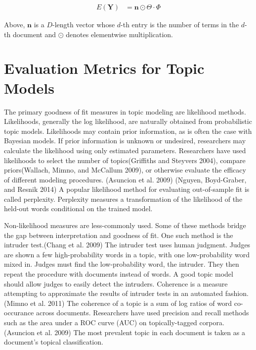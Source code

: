 \documentclass[conference,final,]{IEEEtran}
\begin{document}
\begin{align}
  E(\mathbf{Y}) &= \mathbf{n} \odot \Theta \cdot \Phi
\end{align}

Above, \(\mathbf{n}\) is a \(D\)-length vector whose \(d\)-th entry is
the number of terms in the \(d\)-th document and \(\odot\) denotes
elementwise multiplication.

\hypertarget{evaluation-metrics-for-topic-models}{%
\section{Evaluation Metrics for Topic
Models}\label{evaluation-metrics-for-topic-models}}

The primary goodness of fit measures in topic modeling are likelihood
methods. Likelihoods, generally the log likelihood, are naturally
obtained from probabilistic topic models. Likelihoods may contain prior
information, as is often the case with Bayesian models. If prior
information is unknown or undesired, researchers may calculate the
likelihood using only estimated parameters. Researchers have used
likelihoods to select the number of topics(Griffiths and Steyvers 2004),
compare priors(Wallach, Mimno, and McCallum 2009), or otherwise evaluate
the efficacy of different modeling procedures. (Asuncion et al. 2009)
(Nguyen, Boyd-Graber, and Resnik 2014) A popular likelihood method for
evaluating out-of-sample fit is called perplexity. Perplexity measures a
transformation of the likelihood of the held-out words conditional on
the trained model.

Non-likelihood measures are less-commonly used. Some of these methods
bridge the gap between interpretation and goodness of fit. One such
method is the intruder test.(Chang et al. 2009) The intruder test uses
human judgment. Judges are shown a few high-probability words in a
topic, with one low-probability word mixed in. Judges must find the
low-probability word, the intruder. They then repeat the procedure with
documents instead of words. A good topic model should allow judges to
easily detect the intruders. Coherence is a measure attempting to
approximate the results of intruder tests in an automated fashion.
(Mimno et al. 2011) The coherence of a topic is a sum of log ratios of
word co-occurance across documents. Researchers have used precision and
recall methods such as the area under a ROC curve (AUC) on
topically-tagged corpora.(Asuncion et al. 2009) The most prevalent topic
in each document is taken as a document's topical classification.
\end{document}
